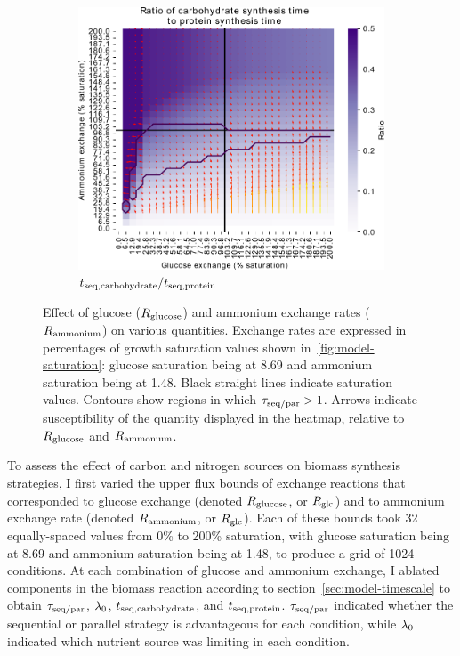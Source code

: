 \begin{figure}
  \begin{subfigure}[t]{0.45\textwidth}
  \centering
    \includegraphics[width=\linewidth]{ec_grid_glc_amm_carb_to_prot}
    \caption{
      $t_{\mathrm{seq},\mathrm{carbohydrate}}/t_{\mathrm{seq},\mathrm{protein}}$
    }
    \label{fig:model-grid-glc-carb-to-prot}
  \end{subfigure}
  \caption{
    Effect of glucose ($R_{\mathrm{glucose}}$) and ammonium exchange rates ($R_{\mathrm{ammonium}}$) on various quantities.
    Exchange rates are expressed in percentages of growth saturation values shown in~\ref{fig:model-saturation}: glucose saturation being at \SI{8.69}{\mmolgdwh} and ammonium saturation being at \SI{1.48}{\mmolgdwh}.
    Black straight lines indicate saturation values.
    Contours show regions in which $\tau_{\mathrm{seq}/\mathrm{par}} > 1$.
    Arrows indicate susceptibility of the quantity displayed in the heatmap, relative to $R_{\mathrm{glucose}}$ and $R_{\mathrm{ammonium}}$.
  }
  \label{fig:model-grid-glc}
\end{figure}

To assess the effect of carbon and nitrogen sources on biomass synthesis strategies, I first varied the upper flux bounds of exchange reactions that corresponded to glucose exchange (denoted $R_{\mathrm{glucose}}$, or $R_{\mathrm{glc}}$) and to ammonium exchange rate (denoted $R_{\mathrm{ammonium}}$, or $R_{\mathrm{glc}}$).
Each of these bounds took 32 equally-spaced values from 0\% to 200\% saturation, with glucose saturation being at \SI{8.69}{\mmolgdwh} and ammonium saturation being at \SI{1.48}{\mmolgdwh}, to produce a grid of \num{1024} conditions.
At each combination of glucose and ammonium exchange, I ablated components in the biomass reaction according to section~\ref{sec:model-timescale} to obtain $\tau_{\mathrm{seq}/\mathrm{par}}$, $\lambda_{0}$, $t_{\mathrm{seq},\mathrm{carbohydrate}}$, and $t_{\mathrm{seq},\mathrm{protein}}$.
$\tau_{\mathrm{seq}/\mathrm{par}}$ indicated whether the sequential or parallel strategy is advantageous for each condition, while $\lambda_{0}$ indicated which nutrient source was limiting in each condition.

